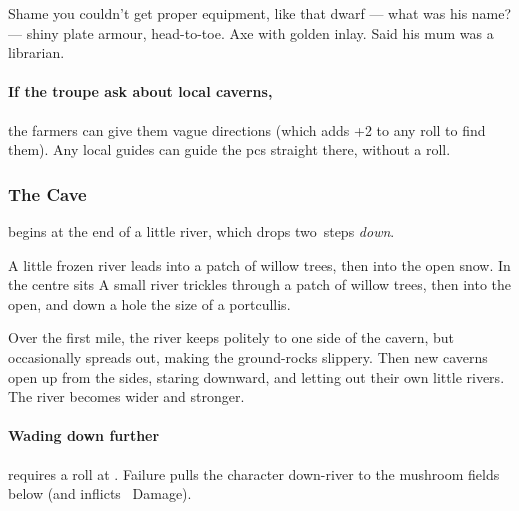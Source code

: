 \documentclass[10pt,twoside]{book}
\begin{document}
\begin{speechtext}
  Shame you couldn't get proper equipment, like that dwarf --- what was his name? --- shiny plate armour, head-to-toe.
  Axe with golden inlay.
  Said his mum was a librarian.
\end{speechtext}

\paragraph{If the troupe ask about local caverns,}
the farmers can give them vague directions (which adds +2 to any roll to find them).
Any local guides can guide the \glspl{pc} straight there, without a roll.

\label{caveMouth}

\togglefalse{intro}

\subsubsection{The Cave}
begins at the end of a little river, which drops two~\glspl{step} \emph{down}.%

\begin{boxtext}
  \ifnum{}
    A little frozen river leads into a patch of willow trees,
    then into the open snow.
    In the centre sits
  \else
    A small river trickles through a patch of willow trees,
    then into the open, and down
  \fi
  a hole the size of a portcullis.
\end{boxtext}

\begin{boxtext}
  Over the first mile, the river keeps politely to one side of the cavern, but occasionally spreads out, making the ground-rocks slippery.
  Then new caverns open up from the sides, staring downward, and letting out their own little rivers.
  The river becomes wider and stronger.
\end{boxtext}

\paragraph{Wading down further}
requires a  roll at \tn[8].
Failure pulls the character down-river to the mushroom fields below (and inflicts ~Damage).
\end{document}
